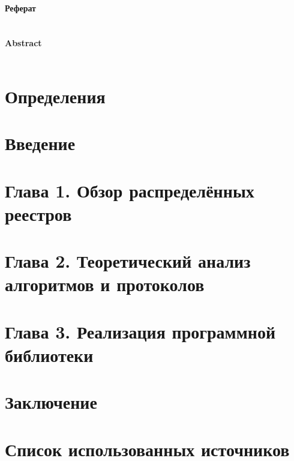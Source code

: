 \documentclass[
encoding=utf8
]{twoeskd}
\newcommand{\+}{\discretionary{\mbox{\scriptsize$\hookleftarrow$}}{}{}}
\begin{document}

\thispagestyle{empty}
\paragraph*{\huge Реферат\\\\}


\newpage

\paragraph*{\huge Abstract\\\\}

\newpage
\tableofcontents


\newpage
\section{Определения}


\newpage
\section{Введение}


\newpage
\section{Глава 1. Обзор распределённых реестров}


\newpage
\section{Глава 2. Теоретический анализ алгоритмов и протоколов}
% 

\newpage
\section{Глава 3. Реализация программной библиотеки}
% 

\newpage
\section{Заключение}
% 

\newpage
\section{Список использованных источников}
% 
\end{document}
